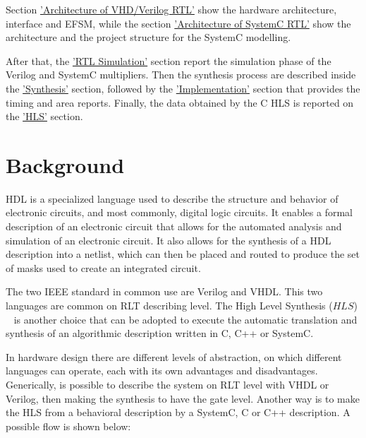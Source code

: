 \documentclass[]{IEEEtran}
\begin{document}
	Section \hyperref[sec:archvhdl]{'Architecture of VHD/Verilog RTL'} show the hardware architecture, interface and EFSM, while the section \hyperref[sec:archsystemc]{'Architecture of SystemC RTL'} show the architecture and the project structure for the SystemC modelling.
	

	After that, the \hyperref[sec:rtlsim]{'RTL Simulation'} section report the simulation phase of the Verilog and SystemC multipliers. Then the synthesis process are described inside the \hyperref[sec:rtlsim]{'Synthesis'} section, followed by the 
	\hyperref[sec:impl]{'Implementation'} section that provides the timing and area reports. Finally, the data obtained by the C HLS is reported on the \hyperref[sec:hls]{'HLS'} section.
	

	\section{Background}
	\label{sec:Background}
	
	HDL is a specialized language used to describe the structure and behavior of electronic circuits, and most commonly, digital logic circuits. It enables a formal description of an electronic circuit that allows for the automated analysis and simulation of an electronic circuit. It also allows for the synthesis of a HDL description into a netlist, which can then be placed and routed to produce the set of masks used to create an integrated circuit. ~\cite{hdlwikipedia}
	
	The two IEEE standard in common use are Verilog and VHDL. This two languages are common on RLT describing level. The High Level Synthesis ($HLS$)  ~\cite{hls} is another choice that can be adopted to execute the automatic translation and synthesis of an algorithmic description written in C, C++ or SystemC.
	
	In hardware design there are different levels of abstraction, on which different languages can operate, each with its own advantages and disadvantages. Generically, is possible to describe the system on RLT level with VHDL or Verilog, then making the synthesis to have the gate level. Another way is to make the HLS from a behavioral description by a SystemC, C or C++ description. A possible flow is shown below:
	
\end{document}
